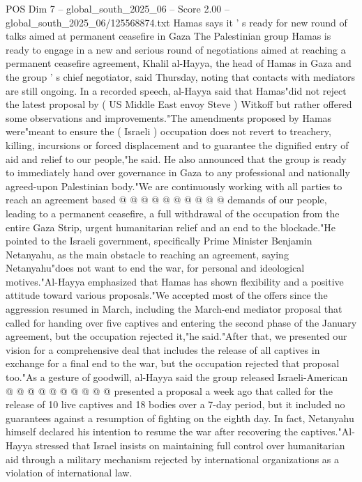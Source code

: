 \begin{textsample}{POS Dim 7 – global\_south\_2025\_06 – Score 2.00 – global\_south\_2025\_06/125568874.txt}  \label{ex:f7_pos_176}
Hamas says it ' s ready for new round of talks aimed at permanent ceasefire in Gaza The Palestinian group Hamas is ready to engage in a new and serious round of negotiations aimed at reaching a permanent ceasefire agreement, Khalil al-Hayya, the head of Hamas in Gaza and the group ' s chief negotiator, said Thursday, noting that contacts with mediators are still ongoing.
In a recorded speech, al-Hayya said that Hamas"did not reject the latest proposal by ( US Middle East envoy Steve ) Witkoff but rather offered some observations and improvements."The amendments proposed by Hamas were"meant to ensure the ( Israeli ) occupation does not revert to treachery, killing, incursions or forced displacement and to guarantee the dignified entry of aid and relief to our people,"he said.
He also announced that the group is ready to immediately hand over governance in Gaza to any professional and nationally agreed-upon Palestinian body."We are continuously working with all parties to reach an agreement based @ @ @ @ @ @ @ @ @ @ demands of our people, leading to a permanent ceasefire, a full withdrawal of the occupation from the entire Gaza Strip, urgent humanitarian relief and an end to the blockade."He pointed to the Israeli government, specifically Prime Minister Benjamin Netanyahu, as the main obstacle to reaching an agreement, saying Netanyahu"does not want to end the war, for personal and ideological motives."Al-Hayya emphasized that Hamas has shown flexibility and a positive attitude toward various proposals."We accepted most of the offers since the aggression resumed in March, including the March-end mediator proposal that called for handing over five captives and entering the second phase of the January agreement, but the occupation rejected it,"he said."After that, we presented our vision for a comprehensive deal that includes the release of all captives in exchange for a final end to the war, but the occupation rejected that proposal too."As a gesture of goodwill, al-Hayya said the group released Israeli-American @ @ @ @ @ @ @ @ @ @ presented a proposal a week ago that called for the release of 10 live captives and 18 bodies over a 7-day period, but it included no guarantees against a resumption of fighting on the eighth day.
In fact, Netanyahu himself declared his intention to resume the war after recovering the captives."Al-Hayya stressed that Israel insists on maintaining full control over humanitarian aid through a military mechanism rejected by international organizations as a violation of international law.

\end{textsample}
